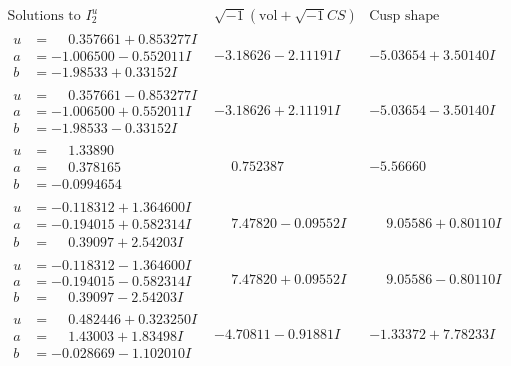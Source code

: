 \documentclass[1p]{elsarticle_modified}
\theoremstyle{definition}
\newcommand{\I}{\sqrt{-1}}
\begin{document}
$$\begin{array}{c|c|c}  
\text{Solutions to }I^u_{2}& \I (\text{vol} + \sqrt{-1}CS) & \text{Cusp shape}\\
 \hline 
\begin{aligned}
u &= \phantom{-}0.357661 + 0.853277 I \\
a &= -1.006500 - 0.552011 I \\
b &= -1.98533 + 0.33152 I\end{aligned}
 & -3.18626 - 2.11191 I & -5.03654 + 3.50140 I \\ \hline\begin{aligned}
u &= \phantom{-}0.357661 - 0.853277 I \\
a &= -1.006500 + 0.552011 I \\
b &= -1.98533 - 0.33152 I\end{aligned}
 & -3.18626 + 2.11191 I & -5.03654 - 3.50140 I \\ \hline\begin{aligned}
u &= \phantom{-}1.33890\phantom{ +0.000000I} \\
a &= \phantom{-}0.378165\phantom{ +0.000000I} \\
b &= -0.0994654\phantom{ +0.000000I}\end{aligned}
 & \phantom{-}0.752387\phantom{ +0.000000I} & -5.56660\phantom{ +0.000000I} \\ \hline\begin{aligned}
u &= -0.118312 + 1.364600 I \\
a &= -0.194015 + 0.582314 I \\
b &= \phantom{-}0.39097 + 2.54203 I\end{aligned}
 & \phantom{-}7.47820 - 0.09552 I & \phantom{-}9.05586 + 0.80110 I \\ \hline\begin{aligned}
u &= -0.118312 - 1.364600 I \\
a &= -0.194015 - 0.582314 I \\
b &= \phantom{-}0.39097 - 2.54203 I\end{aligned}
 & \phantom{-}7.47820 + 0.09552 I & \phantom{-}9.05586 - 0.80110 I \\ \hline\begin{aligned}
u &= \phantom{-}0.482446 + 0.323250 I \\
a &= \phantom{-}1.43003 + 1.83498 I \\
b &= -0.028669 - 1.102010 I\end{aligned}
 & -4.70811 - 0.91881 I & -1.33372 + 7.78233 I \\ \hline\begin{aligned}

\end{aligned}
\end{array}$$
\end{document}
